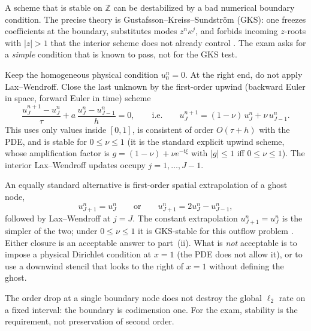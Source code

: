 A scheme that is stable on \(\mathbb{Z}\) can be destabilized by a bad numerical boundary condition. The precise theory is Gustafsson--Kreiss--Sundstr\"om (GKS): one freezes coefficients at the boundary, substitutes modes \(z^n\kappa^j\), and forbids incoming \(z\)-roots with \(\lvert z\rvert>1\) that the interior scheme does not already control \cite{gko95}. The exam asks for a \emph{simple} condition that is known to pass, not for the GKS test.

\begin{construction}
\label{con:nbc-simple}
Keep the homogeneous physical condition \(u_0^n=0\). At the right end, do not apply Lax--Wendroff. Close the last unknown by the first-order upwind (backward Euler in space, forward Euler in time) scheme
\begin{equation}
\label{eq:nbc-upwind}
\frac{u_J^{n+1}-u_J^n}{\tau}
+
a\,\frac{u_J^n-u_{J-1}^n}{h}
=
0,
\qquad\text{i.e.}\qquad
u_J^{n+1}
=
(1-\nu)\,u_J^n
+
\nu\,u_{J-1}^n.
\end{equation}
This uses only values inside \([0,1]\), is consistent of order \(O(\tau+h)\) with the PDE, and is stable for \(0\le\nu\le 1\) (it is the standard explicit upwind scheme, whose amplification factor is \(g=(1-\nu)+\nu e^{-\mathrm{i}\xi}\) with \(\lvert g\rvert\le 1\) iff \(0\le\nu\le 1\)). The interior Lax--Wendroff updates occupy \(j=1,\dots,J-1\).

An equally standard alternative is first-order spatial extrapolation of a ghost node,
\[
u_{J+1}^n
=
u_J^n
\qquad\text{or}\qquad
u_{J+1}^n
=
2u_J^n-u_{J-1}^n,
\]
followed by Lax--Wendroff at \(j=J\). The constant extrapolation \(u_{J+1}^n=u_J^n\) is the simpler of the two; under \(0\le\nu\le 1\) it is GKS-stable for this outflow problem \cite{gko95}. Either closure is an acceptable answer to part~(ii). What is \emph{not} acceptable is to impose a physical Dirichlet condition at \(x=1\) (the PDE does not allow it), or to use a downwind stencil that looks to the right of \(x=1\) without defining the ghost.
\end{construction}

The order drop at a single boundary node does not destroy the global \(\ell_2\) rate on a fixed interval: the boundary is codimension one. For the exam, stability is the requirement, not preservation of second order.

